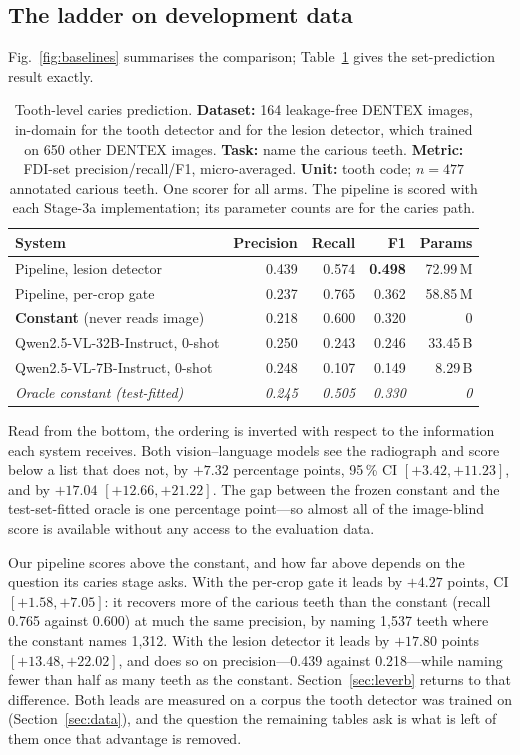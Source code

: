 \documentclass[conference]{IEEEtran}
\begin{document}
\subsection{The ladder on development data}

Fig.~\ref{fig:baselines} summarises the comparison; Table~\ref{tab:fdiset} gives
the set-prediction result exactly.

\begin{table}[t]
\caption{Tooth-level caries prediction. \textbf{Dataset:} 164 leakage-free
DENTEX images, in-domain for the tooth detector and for the lesion detector, which
trained on 650 other DENTEX images. \textbf{Task:} name the carious
teeth. \textbf{Metric:} FDI-set precision/recall/F1, micro-averaged.
\textbf{Unit:} tooth code; $n = 477$ annotated carious teeth. One scorer for all
arms. The pipeline is scored with each Stage-3a implementation; its parameter
counts are for the caries path.}
\label{tab:fdiset}
\centering
\footnotesize
\setlength{\tabcolsep}{3pt}
\begin{tabular}{lrrrr}
\toprule
System & Precision & Recall & F1 & Params \\
\midrule
Pipeline, lesion detector          & 0.439 & 0.574 & \textbf{0.498} & 72.99\,M \\
Pipeline, per-crop gate            & 0.237 & 0.765 & 0.362 & 58.85\,M \\
\textbf{Constant} (never reads image) & 0.218 & 0.600 & 0.320 & 0 \\
Qwen2.5-VL-32B-Instruct, 0-shot    & 0.250 & 0.243 & 0.246 & 33.45\,B \\
Qwen2.5-VL-7B-Instruct, 0-shot     & 0.248 & 0.107 & 0.149 & 8.29\,B \\
\midrule
\textit{Oracle constant (test-fitted)} & \textit{0.245} &
\textit{0.505} & \textit{0.330} & \textit{0} \\
\bottomrule
\end{tabular}
\end{table}

Read from the bottom, the ordering is inverted with respect to the information
each system receives. Both vision--language models see the radiograph and score
below a list that does not, by $+7.32$ percentage points, 95\,\% CI
$[+3.42, +11.23]$, and by $+17.04$ $[+12.66, +21.22]$. The gap between the frozen
constant and the test-set-fitted oracle is one percentage point---so almost all
of the image-blind score is available without any access to the evaluation data.

Our pipeline scores above the constant, and how far above depends on the question
its caries stage asks. With the per-crop gate it leads by $+4.27$ points, CI
$[+1.58, +7.05]$: it recovers more of the carious teeth than the constant (recall
0.765 against 0.600) at much the same precision, by naming 1{,}537 teeth where the
constant names 1{,}312. With the lesion detector it leads by $+17.80$ points
$[+13.48, +22.02]$, and does so on precision---0.439 against 0.218---while naming
fewer than half as many teeth as the constant. Section~\ref{sec:leverb} returns
to that difference. Both leads are measured on a corpus the tooth detector was
trained on (Section~\ref{sec:data}), and the question the remaining tables ask is
what is left of them once that advantage is removed.
\end{document}
